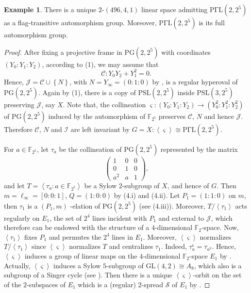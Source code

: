 \documentclass[a4paper,twopage,reqno,12pt]{amsart}
\theoremstyle{definition}
\newtheorem{example}[theorem]{Example}
\numberwithin{equation}{section}
\newcommand{\GL}{\mathrm{GL}}
\newcommand{\PSL}{\mathrm{PSL}}
\newcommand{\PGaL}{\mathrm{P\Gamma L}}
\newcommand{\PG}{\mathrm{PG}}
\begin{document}
\begin{example}
There is a unique $2$-$(496,4,1)$ linear space admitting $\PGaL(2,2^{5})$ as a flag-transitive automorphism group. Moreover, $\PGaL(2,2^{5})$ is its full automorphism group.    
\end{example}
\begin{proof}
After fixing a projective frame in $\PG(2,2^{5})$ with coordinates $%
(Y_{0}:Y_{1}:Y_{2})$, according to (1),  we may assume that 
\[
\mathcal{C}:Y_{0}Y_{2}+Y_{1}^{2}=0\text{.}
\]%
Hence, $\mathcal{J}=\mathcal{C}\cup \left\{ N\right\} $, with $N=Y_{\infty}=(0:1:0)$ by 
\cite[Corollary 7.12]{Hir}, is a regular hyperoval of  $\PG(2,2^{5})$. Again
by (1), there is a copy of $\PSL(2,2^{5})$ inside $\PSL(3,2^{5})$
preserving $\mathcal{J}$, say $X$. Note that, the collineation $\varsigma
:(Y_{0}:Y_{1}:Y_{2})\rightarrow (Y_{0}^{2}:Y_{1}^{2}:Y_{2}^{2})$ of $%
\PG(2,2^{5})$ induced by the automorphism of $\mathbb{F}_{2^{5}}$ preserves $%
\mathcal{C}$, $N$ and hence $\mathcal{J}$. Therefore $\mathcal{C}$, $N$ and $%
\mathcal{I}$ are left invariant by $G=X:\left\langle \varsigma \right\rangle
\cong \PGaL(2,2^{5})$.

For $a\in \mathbb{F}_{2^{5}}$, let $\tau _{a}$ be the collineation of $\PG(2,2^{5})$ represented by the matrix 
\[
\left( 
\begin{array}{ccc}
1 & 0 & 0 \\ 
0 & 1 & 0 \\ 
a^{2} & a & 1%
\end{array}%
\right) \text{,}
\]%
and let $T=\left\langle \tau _{a}:a\in \mathbb{F}_{2^{5}}\right\rangle $ be
a Sylow $2$-subgroup of $X$, and hence of $G$. Then $m=\ell_{\infty}=\left[0:0:1\right]$, $Q=(1:0:0)
$ by (4.i) and (4.ii). Let $P_{1}=(1:1:0)$ on $m$, then $\tau _{1}$ is a $(P_{1},m)$%
-elation of $\PG(2,2^{5})$ (see (4.iii)). Moreover, $T/\left\langle \tau _{1}\right\rangle $
acts regularly on $E_{1}$, the set of $2^{4}$ lines incident with $P_{1}$
and external to $\mathcal{J}$, which therefore can be endowed with the
structure of a $4$-dimensional $\mathbb{F}_{2}$-space. Now, $\left\langle
\tau_{1} \right\rangle $ fixes $P_{1}$ and permutes the $2^{4}$ lines in $%
E_{1}$. Moreover, $\left\langle \varsigma \right\rangle $ normalizes $%
T/\left\langle \tau_{1} \right\rangle $ since $\left\langle \varsigma
\right\rangle $ normalizes $T$ and centralizes $\tau _{1}$. Indeed, $\tau
_{a}^{\varsigma }=\tau _{a^{2}}$. Hence, $\left\langle \varsigma
\right\rangle $ induces a group of linear maps on the $4$-dimensional $%
\mathbb{F}_{2}$-space $E_{1}$ by \cite[Proposition 4.2]{Pass}. Actually, $%
\left\langle \varsigma \right\rangle $ induces a Sylow $5$-subgroup of $%
\GL(4,2)\cong A_{8}$, which also is a subgroup of a Singer cycle (see \cite[%
Section 4.2]{Hir}). Then there is a unique $\left\langle \varsigma
\right\rangle $-orbit on the set of the $2$-subspaces of $E_{1}$ which is a
(regular) $2$-spread $\mathcal{S}$ of $E_{1}$ by \cite[Lemma 2.1]{Dru}.


\end{proof}
\end{document}
